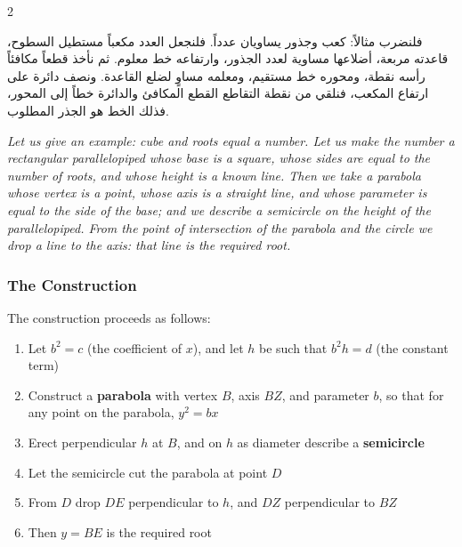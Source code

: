 \documentclass[11pt,a4paper]{book}
\begin{document}
\begin{propositionbox}[Case: $x^3 + c x = d$]
\begin{paracol}{2}

\begin{Arabic}
فلنضرب مثالاً: كعب وجذور يساويان عدداً. فلنجعل العدد مكعباً مستطيل السطوح، قاعدته مربعة، أضلاعها مساوية لعدد الجذور، وارتفاعه خط معلوم. ثم نأخذ قطعاً مكافئاً رأسه نقطة، ومحوره خط مستقيم، ومعلمه مساوٍ لضلع القاعدة. ونصف دائرة على ارتفاع المكعب، فنلقي من نقطة التقاطع القطع المكافئ والدائرة خطاً إلى المحور، فذلك الخط هو الجذر المطلوب.
\end{Arabic}

\switchcolumn

\textit{Let us give an example: cube and roots equal a number. Let us make the number a rectangular parallelopiped whose base is a square, whose sides are equal to the number of roots, and whose height is a known line. Then we take a parabola whose vertex is a point, whose axis is a straight line, and whose parameter is equal to the side of the base; and we describe a semicircle on the height of the parallelopiped. From the point of intersection of the parabola and the circle we drop a line to the axis: that line is the required root.}

\end{paracol}
\end{propositionbox}

\subsubsection{The Construction}
\label{subsubsec:construction}

The construction proceeds as follows:

\begin{enumerate}[noitemsep]
\item Let $b^2 = c$ (the coefficient of $x$), and let $h$ be such that $b^2 h = d$ (the constant term)
\item Construct a \textbf{parabola} with vertex $B$, axis $BZ$, and parameter $b$, so that for any point on the parabola, $y^2 = b x$
\item Erect perpendicular $h$ at $B$, and on $h$ as diameter describe a \textbf{semicircle}
\item Let the semicircle cut the parabola at point $D$
\item From $D$ drop $DE$ perpendicular to $h$, and $DZ$ perpendicular to $BZ$
\item Then $y = BE$ is the required root
\end{enumerate}
\end{document}
